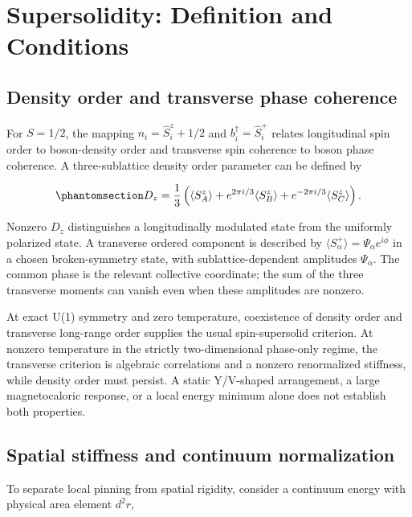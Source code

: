 \clearpage

\section{Supersolidity: Definition and
Conditions}\label{sec-nbcp-supersolidity}

\subsection{Density order and transverse phase
coherence}\label{density-order-and-transverse-phase-coherence}

For \(S=1/2\), the mapping \(n_i=\hat S_i^z+1/2\) and
\(b_i^\dagger=\hat S_i^+\) relates longitudinal spin order to
boson-density order and transverse spin coherence to boson phase
coherence. A three-sublattice density order parameter can be defined by

\begin{equation}\phantomsection\label{eq-nbcp-density-order}{
D_z=\frac13\left(\langle S_A^z\rangle+
e^{2\pi i/3}\langle S_B^z\rangle+
e^{-2\pi i/3}\langle S_C^z\rangle\right).
}\end{equation}

Nonzero \(D_z\) distinguishes a longitudinally modulated state from the
uniformly polarized state. A transverse ordered component is described
by \(\langle S_\alpha^+\rangle=\Psi_\alpha e^{i\phi}\) in a chosen
broken-symmetry state, with sublattice-dependent amplitudes
\(\Psi_\alpha\). The common phase is the relevant collective coordinate;
the sum of the three transverse moments can vanish even when these
amplitudes are nonzero.

At exact U(1) symmetry and zero temperature, coexistence of density
order and transverse long-range order supplies the usual spin-supersolid
criterion. At nonzero temperature in the strictly two-dimensional
phase-only regime, the transverse criterion is algebraic correlations
and a nonzero renormalized stiffness, while density order must persist.
A static Y/V-shaped arrangement, a large magnetocaloric response, or a
local energy minimum alone does not establish both properties.

\subsection{Spatial stiffness and continuum
normalization}\label{spatial-stiffness-and-continuum-normalization}

To separate local pinning from spatial rigidity, consider a continuum
energy with physical area element \(d^2r\),

